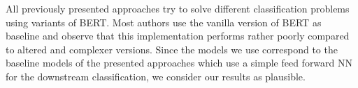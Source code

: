 All previously presented approaches try to solve different classification problems using variants of \ac{BERT}.
Most authors use the vanilla version of \ac{BERT} as baseline and observe that this implementation performs rather poorly compared to altered and complexer versions.
Since the models we use correspond to the baseline models of the presented approaches which use a simple feed forward \ac{NN} for the downstream classification, we consider our results as plausible.
